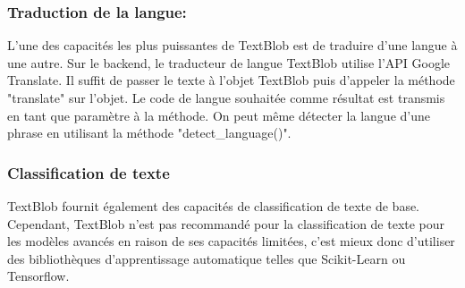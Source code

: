 \subsubsection{Traduction de la langue:}
L'une des capacités les plus puissantes de TextBlob est de traduire d'une langue à une autre. Sur le backend, le traducteur de langue TextBlob utilise l'API Google Translate. Il suffit de passer le texte à l'objet TextBlob puis d'appeler la méthode "translate" sur l'objet. Le code de langue souhaitée comme résultat est transmis en tant que paramètre à la méthode.
On peut même détecter la langue d'une phrase en utilisant la méthode "detect\_language()".
\subsubsection{Classification de texte}
TextBlob fournit également des capacités de classification de texte de base. Cependant, TextBlob n'est pas recommandé pour la classification de texte pour les modèles avancés en raison de ses capacités limitées, c'est mieux donc d'utiliser des bibliothèques d'apprentissage automatique telles que Scikit-Learn ou Tensorflow.
